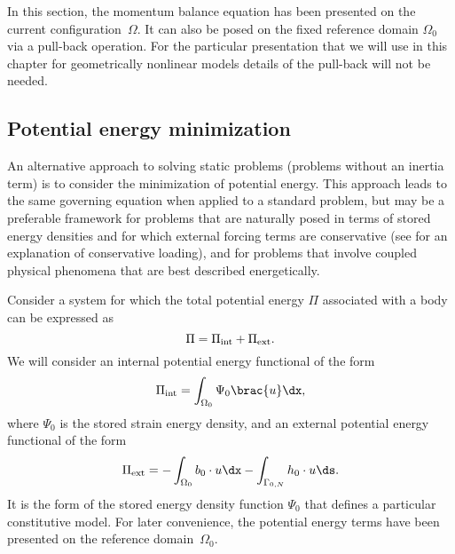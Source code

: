 In this section, the momentum balance equation has been presented
on the current configuration~$\Omega$. It can also be posed on the
fixed reference domain $\Omega_{0}$ via a pull-back operation.  For the
particular presentation that we will use in this chapter for geometrically
nonlinear models details of the pull-back will not be needed.
\subsection{Potential energy minimization}
\label{sec:oelgaard-1:minimization}

An alternative approach to solving static problems (problems without an
inertia term) is to consider the minimization of potential energy. This
approach leads to the same governing equation when applied to a
standard problem, but may be a preferable framework for problems that are
naturally posed in terms of stored energy densities and for which external
forcing terms are conservative (see \citet[p.~159]{Holzapfel2000} for
an explanation of conservative loading), and for problems that involve
coupled physical phenomena that are best described energetically.

Consider a system for which the total potential energy $\Pi$ associated
with a body can be expressed as
\begin{equation}
\label{eq:oelgaard-1:gov_potential_energy}
  \Pi = \Pi_{\rm int} + \Pi_{\rm ext}.
\end{equation}
We will consider an internal potential energy functional of the form
\begin{equation}
  \Pi_{\rm int} = \int_{\Omega_{0}} \Psi_{0}\brac{u} \dx,
\end{equation}
%
where $\Psi_{0}$ is the stored strain energy density, and an
external potential energy functional of the form
\begin{equation}
  \Pi_{\rm ext} = - \int_{\Omega_{0}} b_{0} \cdot u \dx
      - \int_{\Gamma_{0, N}} h_{0} \cdot u \ds.
\end{equation}
%
It is the form of the stored energy density function $\Psi_{0}$ that
defines a particular constitutive model.  For later convenience,
the potential energy terms have been presented on the reference
domain~$\Omega_{0}$.

